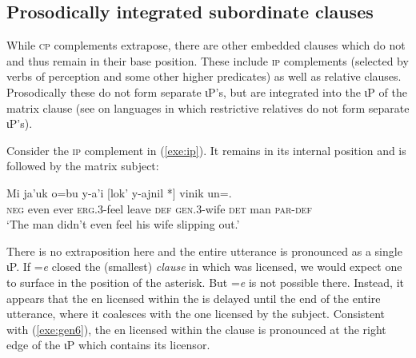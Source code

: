 \documentclass[output=paper,
modfonts
]{LSP/langsci}
\begin{document}
 \subsection{Prosodically integrated subordinate clauses}
While \textsc{cp} complements extrapose, there are other embedded clauses which do not and thus remain in their
base position. These include
\textsc{ip} complements (selected by verbs of perception and some other higher predicates) 
as well as relative clauses. Prosodically these do not form separate ιP's, but are integrated into the ιP 
of the matrix clause  (see \citealt{an2007} on languages in which restrictive relatives do not form separate ιP's).

Consider the \textsc{ip} complement in (\ref{exe:ip}). It remains in its internal position and is followed by the matrix subject:

\begin{exe}
\ex\label{exe:ip}\bridgeoverex
\gll
 Mi ja'uk o=bu y-a'i [lok'  y-ajnil *]  vinik un=. \\
 \textsc{neg} even ever \textsc{erg.3}-feel leave \textsc{def} \textsc{gen.3}-wife {} \textsc{det} man \textsc{par-def} \\
 \glt `The man didn't even feel his wife slipping out.' \citep[49]{laughlin1977}
 \end{exe}
There is no extraposition here and the entire utterance is pronounced as a single ιP. If =\emph{e} closed the (smallest) \emph{clause} in which was licensed, we would expect 
one to surface in the position of the asterisk. But =\emph{e}  is not possible there.
Instead, it appears that the en licensed within the  is delayed until the end of the entire utterance,
where it coalesces with the one licensed by the subject. Consistent with (\ref{exe:gen6}), the en licensed within the  clause is pronounced at the right edge of the ιP which contains its licensor.
\end{document}
